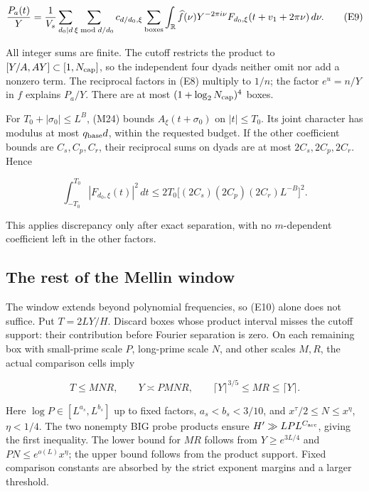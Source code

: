 \[
\frac{P_a(t)}Y=
\frac1{V_s}\sum_{d_0\mid d}\sum_{\xi\bmod d/d_0}
 c_{d/d_0,\xi}\sum_{\rm boxes}
 \int_{\mathbb R}\widehat f(\nu)Y^{-2\pi i\nu}
 F_{d_0,\xi}(t+v_1+2\pi\nu)\,d\nu.
\tag{E9}
\]

All integer sums are finite. The cutoff restricts the product to
\([Y/A,AY]\subset[1,N_{\rm cap}]\), so the independent four dyads
neither omit nor add a nonzero term. The reciprocal factors in (E8)
multiply to \(1/n\); the factor \(e^u=n/Y\) in \(f\) explains \(P_a/Y\).
There are at most \((1+\log_2N_{\rm cap})^4\) boxes.

For \(T_0+|\sigma_0|\le L^B\), (M24) bounds \(A_\xi(t+\sigma_0)\) on
\(|t|\le T_0\). Its joint character has modulus at most
\(q_{\rm base}d\), within the requested budget. If the other coefficient
bounds are \(C_s,C_p,C_r\), their reciprocal sums on dyads are at most
\(2C_s,2C_p,2C_r\). Hence

\[
\int_{-T_0}^{T_0}|F_{d_0,\xi}(t)|^2\,dt
 \le2T_0\bigl[(2C_s)(2C_p)(2C_r)L^{-B}\bigr]^2.
\tag{E10}
\]

This applies discrepancy only after exact separation, with no
\(m\)-dependent coefficient left in the other factors.


\hypertarget{local-energy-the-rest-of-the-mellin-window}{%
\subsection{The rest of the Mellin
window}\label{local-energy-the-rest-of-the-mellin-window}}

The window extends beyond polynomial frequencies, so (E10) alone does
not suffice. Put \(T=2LY/H\). Discard boxes whose product interval
misses the cutoff support: their contribution before Fourier separation
is zero. On each remaining box with small-prime scale \(P\), long-prime
scale \(N\), and other scales \(M,R\), the actual comparison cells imply

\[
T\le MNR,\qquad Y\asymp PMNR,\qquad
\lceil Y\rceil^{3/5}\le MR\le\lceil Y\rceil.
\tag{E11}
\]

Here \(\log P\in[L^{a_s},L^{b_s}]\) up to fixed factors,
\(a_s<b_s<3/10\), and \(x^\tau/2\le N\le x^\eta\), \(\eta<1/4\). The two
nonempty BIG probe products ensure \(H'\gg LP L^{C_{\rm arc}}\), giving
the first inequality. The lower bound for \(MR\) follows from
\(Y\ge e^{3L/4}\) and \(PN\le e^{o(L)}x^\eta\); the upper bound follows
from the product support. Fixed comparison constants are absorbed by the
strict exponent margins and a larger threshold.

